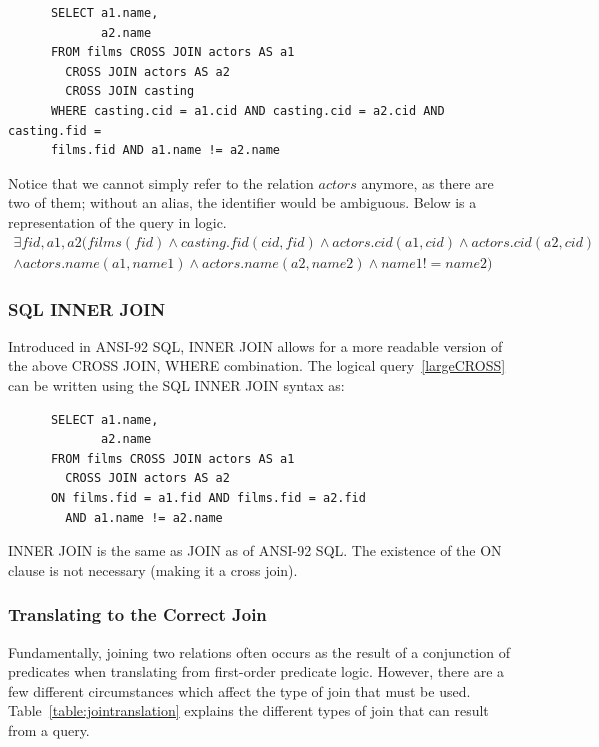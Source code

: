 \documentclass[a4paper, 11pt]{article}
\begin{document}
      \begin{verbatim}
      SELECT a1.name,
             a2.name
      FROM films CROSS JOIN actors AS a1
        CROSS JOIN actors AS a2
        CROSS JOIN casting
      WHERE casting.cid = a1.cid AND casting.cid = a2.cid AND casting.fid =
      films.fid AND a1.name != a2.name
      \end{verbatim}
      Notice that we cannot simply refer to the relation $actors$ anymore, as
      there are two of them; without an alias, the identifier would be
      ambiguous. Below is a representation of the query in logic.
      \begin{multline}
        \label{largeCROSS}
        \exists fid, a1, a2(films(fid) \land casting.fid(cid, fid) \land
        actors.cid(a1, cid) \land actors.cid(a2, cid) \\
        \land actors.name(a1, name1) \land actors.name(a2, name2) \land name1 != name2)
      \end{multline}

    \subsubsection{SQL INNER JOIN}

      Introduced in ANSI-92 SQL, INNER JOIN allows for a more readable version of
      the above CROSS JOIN, WHERE combination. The logical query~\ref{largeCROSS}
      can be written using the SQL INNER JOIN syntax as:

      \begin{verbatim}
      SELECT a1.name,
             a2.name
      FROM films CROSS JOIN actors AS a1
        CROSS JOIN actors AS a2
      ON films.fid = a1.fid AND films.fid = a2.fid 
        AND a1.name != a2.name
      \end{verbatim}

      INNER JOIN is the same as JOIN as of ANSI-92 SQL. The existence of
      the ON clause is not necessary (making it a cross join).

    \subsubsection{Translating to the Correct Join}

      Fundamentally, joining two relations often occurs as the result of a
      conjunction of predicates when translating from first-order predicate
      logic. However, there are a few different circumstances which affect the
      type of join that must be used. Table~\ref{table:jointranslation} explains
      the different types of join that can result from a query.
\end{document}
